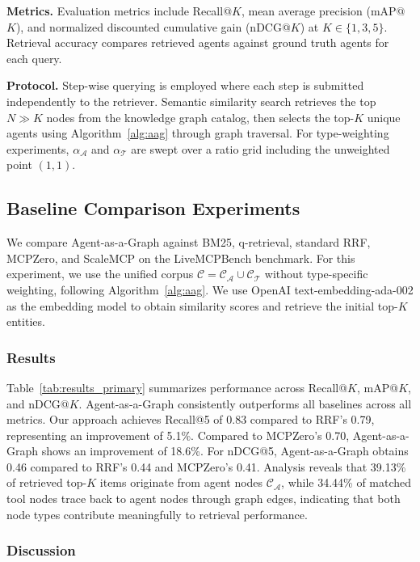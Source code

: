 \documentclass[a4paper,twoside]{article}
\begin{document}
\textbf{Metrics.} Evaluation metrics include Recall@\(K\), mean average precision (mAP@\(K\)), and normalized discounted cumulative gain (nDCG@\(K\)) at \(K \in \{1, 3, 5\}\). Retrieval accuracy compares retrieved agents against ground truth agents for each query.


\textbf{Protocol.} Step-wise querying is employed where each step is submitted independently to the retriever. Semantic similarity search retrieves the top \(N \gg K\) nodes from the knowledge graph catalog, then selects the top-\(K\) unique agents using Algorithm~\ref{alg:aag} through graph traversal. For type-weighting experiments, \(\alpha_{\mathcal{A}}\) and \(\alpha_{\mathcal{T}}\) are swept over a ratio grid including the unweighted point \((1,1)\).




\subsection{Baseline Comparison Experiments}

We compare Agent-as-a-Graph against BM25, q-retrieval, standard RRF, MCPZero, and ScaleMCP on the LiveMCPBench benchmark. For this experiment, we use the unified corpus \(\mathcal{C}=\mathcal{C_A}\cup\mathcal{C_T}\) without type-specific weighting, following Algorithm~\ref{alg:aag}. We use OpenAI text-embedding-ada-002 as the embedding model to obtain similarity scores and retrieve the initial top-\(K\) entities.

\subsubsection{Results}

Table~\ref{tab:results_primary} summarizes performance across Recall@\(K\), mAP@\(K\), and nDCG@\(K\). Agent-as-a-Graph consistently outperforms all baselines across all metrics. Our approach achieves Recall@5 of 0.83 compared to RRF's 0.79, representing an improvement of 5.1\%. Compared to MCPZero's 0.70, Agent-as-a-Graph shows an improvement of 18.6\%. For nDCG@5, Agent-as-a-Graph obtains 0.46 compared to RRF's 0.44 and MCPZero's 0.41. Analysis reveals that 39.13\% of retrieved top-\(K\) items originate from agent nodes \(\mathcal{C_A}\), while 34.44\% of matched tool nodes trace back to agent nodes through graph edges, indicating that both node types contribute meaningfully to retrieval performance.

\subsubsection{Discussion}
\end{document}
